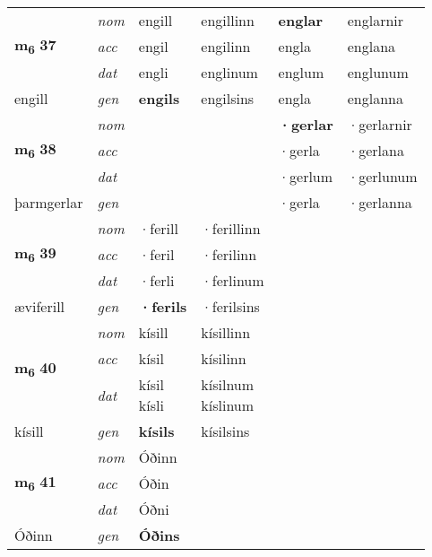 \begin{longtable}[l]{X>{\footnotesize\itshape}XXXXX}
\multirow{3}{*}{{{\textbf{m{\textsubscript{6}}} \Large{\textbf{37}}}}}  
 & nom & engill & engillinn    & \textbf{englar} & englarnir  \\*
 & acc & engil  & engilinn   & engla  & englana \\*
 & dat & engli & englinum   & englum & englunum \\*
 {\footnotesize{engill}} &  gen & \textbf{engils}  & engilsins  & engla & englanna \\
\cmidrule{1-6}


\multirow{3}{*}{{{\textbf{m{\textsubscript{6}}} \Large{\textbf{38}}}}}  
 & nom &  &     & \textbf{·gerlar} & ·gerlarnir  \\*
 & acc &   &    & ·gerla  & ·gerlana \\*
 & dat &  &    & ·gerlum & ·gerlunum \\*
 {\footnotesize{þarmgerlar}} &  gen & \textbf{}  &   & ·gerla & ·gerlanna \\
\cmidrule{1-6}


\multirow{3}{*}{{{\textbf{m{\textsubscript{6}}} \Large{\textbf{39}}}}}  
 & nom & ·ferill & ·ferillinn    & \textbf{} &   \\*
 & acc & ·feril  & ·ferilinn   &   &  \\*
 & dat & ·ferli & ·ferlinum   &  &  \\*
 {\footnotesize{æviferill}} &  gen & \textbf{·ferils}  & ·ferilsins  &  &  \\
\cmidrule{1-6}


\multirow{3}{*}{{{\textbf{m{\textsubscript{6}}} \Large{\textbf{40}}}}}  
 & nom & kísill & kísillinn    & \textbf{} &   \\*
 & acc & kísil  & kísilinn   &   &  \\*
 & dat & \specialcell{kísil\\ kísli} & \specialcell{kísilnum\\ kíslinum}   &  &  \\*
 {\footnotesize{kísill}} &  gen & \textbf{kísils}  & kísilsins  &  &  \\
\cmidrule{1-6}


\multirow{3}{*}{{{\textbf{m{\textsubscript{6}}} \Large{\textbf{41}}}}}  
 & nom & Óðinn &     & \textbf{} &   \\*
 & acc & Óðin  &    &   &  \\*
 & dat & Óðni &    &  &  \\*
 {\footnotesize{Óðinn}} &  gen & \textbf{Óðins}  &   &  &  \\
\cmidrule{1-6}



\end{longtable}
